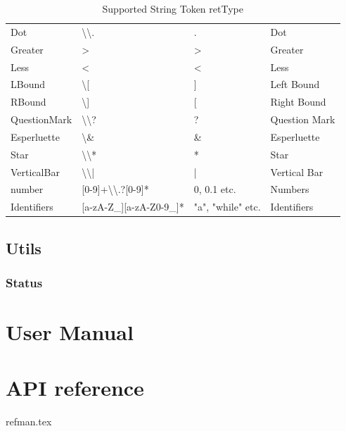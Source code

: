 \documentclass{report}
\newcommand{\+}{}
\begin{document}
\begin{table}[hb!]
\begin{tabular}{l|lll}
            Dot          & \textbackslash{}\textbackslash{}.                      & .                 & Dot            \\
            Greater      & \textgreater{}                                         & \textgreater{}    & Greater        \\
            Less         & \textless{}                                            & \textless{}       & Less           \\
            LBound       & \textbackslash{}[                                      & {]}               & Left Bound     \\
            RBound       & \textbackslash{}]                                      & {[}               & Right Bound    \\
            QuestionMark & \textbackslash{}\textbackslash{}?                      & ?                 & Question Mark  \\
            Esperluette  & \textbackslash{}\&                                     & \&                & Esperluette    \\
            Star         & \textbackslash{}\textbackslash{}*                      & *                 & Star           \\
            VerticalBar  & \textbackslash{}\textbackslash{}|                      & |                 & Vertical Bar   \\
            number       & {[}0-9{]}+\textbackslash{}\textbackslash{}.?{[}0-9{]}* & 0, 0.1 etc.       & Numbers        \\
            Identifiers  & {[}a-zA-Z\_{]}{[}a-zA-Z0-9\_{]}*                       & "a", "while" etc. & Identifiers    \\ \hline
        \end{tabular}
        \caption{Supported String Token retType}
        \label{tab:supported_lexical_token_list}
    \end{table}

    \subsection{Utils}\label{subsec:utils}

    \subsubsection{Status }


    \section{User Manual}\label{sec:user-manual}

    \appendix


    \section{API reference }
    {refman.tex}

    \printindex
\end{document}
